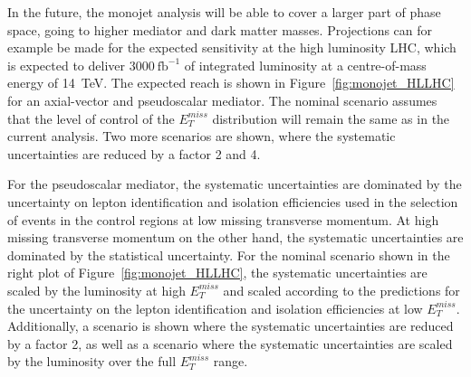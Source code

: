 In the future, the monojet analysis will be able to cover a larger part of phase space, going to higher mediator and dark matter masses. Projections can for example be made for the expected sensitivity at the high luminosity \ac{LHC}, which is expected to deliver $3000\ \mathrm{fb}^{-1}$ of integrated luminosity at a centre-of-mass energy of \SI{14}{TeV}. The expected reach is shown in Figure~\ref{fig:monojet_HLLHC} for an axial-vector and pseudoscalar mediator. 
The nominal scenario assumes that the level of control of the $E_T^{miss}$ distribution will remain the same as in the current analysis. Two more scenarios are shown, where the systematic uncertainties are reduced by a factor 2 and 4. 

For the pseudoscalar mediator, 
the systematic uncertainties are dominated by the uncertainty on lepton identification and isolation efficiencies used in the selection of events in the control regions at low missing transverse momentum. At high missing transverse momentum on the other hand, the systematic uncertainties are dominated by the statistical uncertainty. For the nominal scenario shown in the right plot of Figure~\ref{fig:monojet_HLLHC}, the systematic uncertainties are scaled by the luminosity at high $E_T^{miss}$ and scaled according to the predictions for the uncertainty on the lepton identification and isolation efficiencies at low $E_T^{miss}$. Additionally, a scenario is shown where the systematic uncertainties are reduced by a factor 2, as well as a scenario where the systematic uncertainties are scaled by the luminosity over the full $E_T^{miss}$ range.

